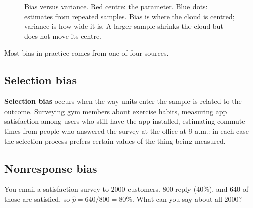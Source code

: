 \begin{figure}[H]
\centering
{}
\caption{Bias versus variance. Red centre: the parameter. Blue dots: estimates from
repeated samples. Bias is where the cloud is centred; variance is how wide it is. A
larger sample shrinks the cloud but does not move its centre.}
\label{fig:sampling-dartboard}
\end{figure}

Most bias in practice comes from one of four sources.

\subsection{Selection bias}

\textbf{Selection bias} occurs when the way units enter the sample is related to the
outcome. Surveying gym members about exercise habits, measuring app satisfaction among
users who still have the app installed, estimating commute times from people who answered
the survey at the office at 9 a.m.: in each case the selection process prefers certain
values of the thing being measured.

\subsection{Nonresponse bias}

You email a satisfaction survey to $2000$ customers. $800$ reply ($40\%$), and $640$ of
those are satisfied, so $\hat p = 640/800 = 80\%$. What can you say about all $2000$?

